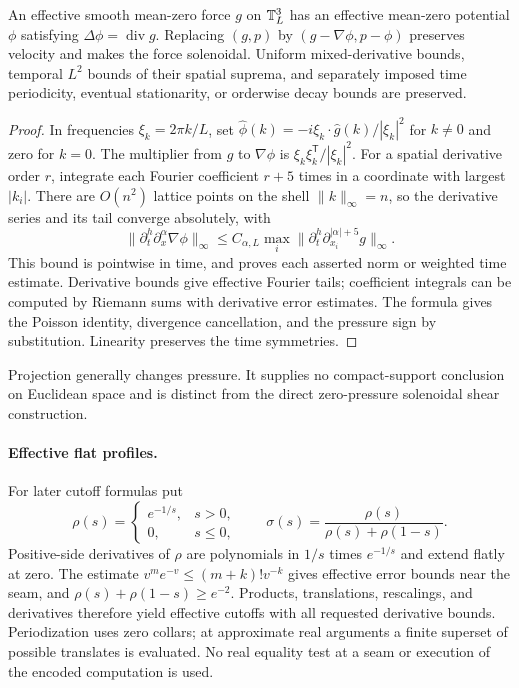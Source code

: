\begin{proposition}\label{prop:projection-l2}
An effective smooth mean-zero force $g$ on $\mathbb T_L^3$ has an effective
mean-zero potential $\phi$ satisfying $\Delta\phi=\operatorname{div}g$.
Replacing $(g,p)$ by $(g-\nabla\phi,p-\phi)$ preserves velocity and makes
the force solenoidal. Uniform mixed-derivative bounds, temporal $L^2$
bounds of their spatial suprema, and separately imposed time periodicity,
eventual stationarity, or orderwise decay bounds are preserved.
\end{proposition}
\begin{proof}
In frequencies $\xi_k=2\pi k/L$, set
$\widehat\phi(k)=-i\xi_k\cdot\widehat g(k)/|\xi_k|^2$ for $k\ne0$
and zero for $k=0$. The multiplier from $g$ to $\nabla\phi$ is
$\xi_k\xi_k^{\mathsf T}/|\xi_k|^2$. For a spatial derivative order $r$,
integrate each Fourier coefficient $r+5$ times in a coordinate with largest
$|k_i|$. There are $O(n^2)$ lattice points on the shell $\|k\|_\infty=n$,
so the derivative series and its tail converge absolutely, with
\[
 \|\partial_t^h\partial_x^\alpha\nabla\phi\|_\infty
 \le C_{\alpha,L}\max_i
       \|\partial_t^h\partial_{x_i}^{|\alpha|+5}g\|_\infty.
\]
This bound is pointwise in time, and proves each asserted norm or weighted
time estimate. Derivative bounds give effective Fourier tails; coefficient
integrals can be computed by Riemann sums with derivative error estimates.
The formula gives the Poisson identity, divergence cancellation, and the
pressure sign by substitution. Linearity preserves the time symmetries.
\end{proof}
Projection generally changes pressure. It supplies no compact-support
conclusion on Euclidean space and is distinct from the direct zero-pressure
solenoidal shear construction.

\paragraph{Effective flat profiles.}
For later cutoff formulas put
\begin{equation}\label{eq:p2-step}
 \rho(s)=\begin{cases}e^{-1/s},&s>0,\\0,&s\le0,\end{cases}
 \qquad \sigma(s)=\frac{\rho(s)}{\rho(s)+\rho(1-s)}.
\end{equation}
Positive-side derivatives of $\rho$ are polynomials in $1/s$ times
$e^{-1/s}$ and extend flatly at zero. The estimate
$v^me^{-v}\le(m+k)!v^{-k}$ gives effective error bounds near the seam,
and $\rho(s)+\rho(1-s)\ge e^{-2}$. Products, translations, rescalings,
and derivatives therefore yield effective cutoffs with all requested
derivative bounds. Periodization uses zero collars; at approximate real
arguments a finite superset of possible translates is evaluated. No real
equality test at a seam or execution of the encoded computation is used.
